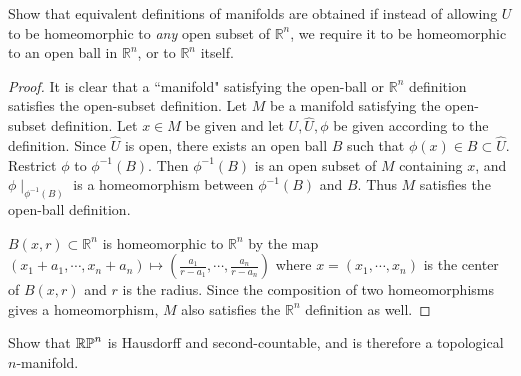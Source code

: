 \begin{customexer}{1.1}\label{exercise_1_1}
  Show that equivalent definitions of manifolds are obtained if instead of allowing $U$ to be homeomorphic to \textit{any} open subset of $\mathbb{R}^n$, we require it to be homeomorphic to an open ball in $\mathbb{R}^n$, or to $\mathbb{R}^n$ itself.
\end{customexer}

\begin{proof}
  It is clear that a ``manifold" satisfying the open-ball or $\mathbb{R}^n$ definition satisfies the open-subset definition.
  Let $M$ be a manifold satisfying the open-subset definition.
  Let $x \in M$ be given and let $U, \hat{U}, \phi$ be given according to the definition.
  Since $\hat{U}$ is open, there exists an open ball $B$ such that $\phi(x) \in B \subset \hat{U}$.
  Restrict $\phi$ to $\phi^{-1}(B)$.
  Then $\phi^{-1}(B)$ is an open subset of $M$ containing $x$, and $\phi\mid_{\phi^{-1}(B)}$ is a homeomorphism between $\phi^{-1}(B)$ and $B$.
  Thus $M$ satisfies the open-ball definition.

  $B(x, r) \subset \mathbb{R}^n$ is homeomorphic to $\mathbb{R}^n$ by the map $(x_1 + a_1, \cdots, x_n + a_n) \mapsto (\frac{a_1}{r - a_1}, \cdots, \frac{a_n}{r - a_n})$ where $x = (x_1, \cdots, x_n)$ is the center of $B(x, r)$ and $r$ is the radius.
  Since the composition of two homeomorphisms gives a homeomorphism, $M$ also satisfies the $\mathbb{R}^n$ definition as well.
\end{proof}


\begin{customexer}{1.6}
  Show that $\operatorname{\mathbb{R}\mathbb{P}}^n$ is Hausdorff and second-countable, and is therefore a topological $n$-manifold.
\end{customexer}

